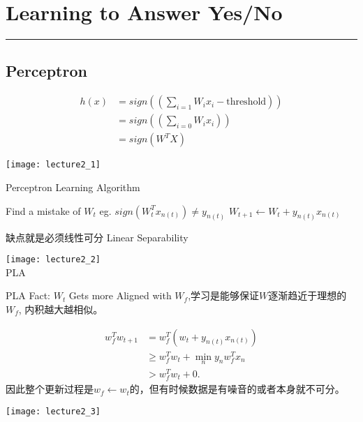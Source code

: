 \section{Learning to Answer Yes/No} %
\noindent
{\color{LightRubineRed} \rule{\linewidth}{1mm} }
\subsection{Perceptron}
\begin{align*}
h(x) &= sign((\sum_{i=1} W_i x_i - \text{threshold})) \\
     &= sign((\sum_{i=0} W_i x_i)) \\
     &= sign(W^TX)
\end{align*}
\begin{center}
\texttt{[image: lecture2\_1]}\\
\end{center}
\begin{algorithm}  
\caption{Perceptron Learning Algorithm}  
\begin{algorithmic}  
	\STATE Find a \textcolor{Mycolor1}{mistake} of $W_t$
	\STATE eg. $sign(W_{t}^{T}x_{n(t)}) \neq y_{n(t)}$ 
	\STATE $W_{t+1} \gets W_{t} + y_{n(t)}x_{n(t)}$ 
\ENDFOR
\end{algorithmic}  
\end{algorithm}
缺点就是必须线性可分 Linear Separability \par
\begin{center}
\texttt{[image: lecture2\_2]}\\
PLA \par
\end{center}
PLA Fact: $W_t$ Gets more Aligned with $W_f$,学习是能够保证$W$逐渐趋近于理想的$W_f$,
内积越大越相似。\par
\begin{align*}
w_f^{T}w_{t+1} &= w_f^{T}(w_t + y_{n(t)}x_{n(t)}) \\
               &\geq w_f^{T}w_t + \underset{n}{\min}y_nw_f^Tx_n \\
               &> w_f^Tw_t + 0.
\end{align*}
因此整个更新过程是$w_f \gets w_t$的，但有时候数据是有噪音的或者本身就不可分。 \par
\begin{center}
\texttt{[image: lecture2\_3]}\\
\end{center}

